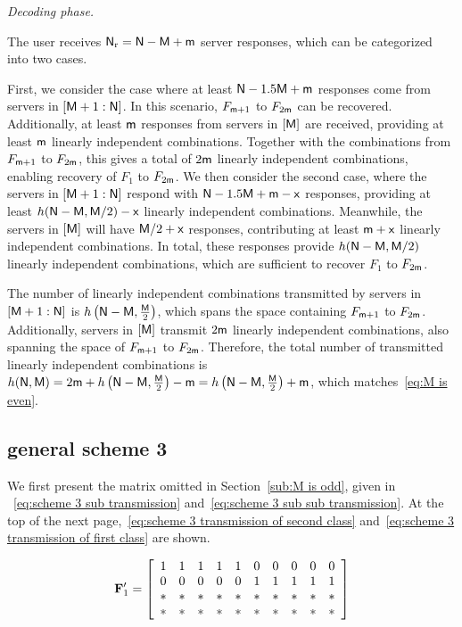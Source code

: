 \documentclass[conference,letterpaper]{IEEEtran}
\begin{document}
{\it Decoding phase.}

The user receives ${\sf N}_{\rm r} = {\sf N} - {\sf M} + {\sf m}$ server responses, which can be categorized into two cases.

First, we consider the case where at least ${\sf N} - 1.5{\sf M} + {\sf m}$ responses come from servers in $[{\sf M}+1 : {\sf N}]$. In this scenario, $F_{{\sf m}+1}$ to $F_{2{\sf m}}$ can be recovered. Additionally, at least ${\sf m}$ responses from servers in $[{\sf M}]$ are received, providing at least ${\sf m}$ linearly independent combinations. Together with the combinations from $F_{{\sf m}+1}$ to $F_{2{\sf m}}$, this gives a total of $2{\sf m}$ linearly independent combinations, enabling recovery of $F_1$ to $F_{2{\sf m}}$.
We then consider the second case, where the servers in $[{\sf M}+1: {\sf N}]$ respond with ${\sf N} - 1.5{\sf M} + {\sf m} - {\sf x}$ responses, providing at least $h({\sf N} - {\sf M}, {\sf M}/2) - {\sf x}$ linearly independent combinations. Meanwhile, the servers in $[{\sf M}]$ will have ${\sf M}/2 + {\sf x}$ responses, contributing at least ${\sf m} +{\sf x}$ linearly independent combinations. In total, these responses provide $h({\sf N} - {\sf M}, {\sf M}/2)$ linearly independent combinations, which are sufficient to recover $F_1$ to $F_{2{\sf m}}$.

The number of linearly independent combinations transmitted by servers in $[{\sf M}+1:{\sf N}]$ is $h\left({\sf N}-{\sf M}, \frac{{\sf M}}{2}\right)$, which spans the space containing $F_{{\sf m}+1}$ to $F_{2{\sf m}}$. Additionally, servers in $[{\sf M}]$ transmit $2{\sf m}$ linearly independent combinations, also spanning the space of $F_{{\sf m}+1}$ to $F_{2{\sf m}}$. Therefore, the total number of transmitted linearly independent combinations is $h({\sf N},{\sf M})= 2{\sf m} + h\left({\sf N}-{\sf M}, \frac{{\sf M}}{2}\right) - {\sf m} = h\left({\sf N}-{\sf M}, \frac{{\sf M}}{2}\right) + {\sf m}$, which matches~\eqref{eq:M is even}.

\subsection{general scheme 3}
\label{general scheme 3}

We first present the matrix omitted in Section~\ref{sub:M is odd}, given in 
~\ref{eq:scheme 3 sub transmission} and~\ref{eq:scheme 3 sub sub transmission}. 
At the top of the next page,~\ref{eq:scheme 3 transmission of second class} 
and~\ref{eq:scheme 3 transmission of first class} are shown.



\begin{equation} \label{eq:scheme 3 sub transmission}
{\bf F}^{\prime}_1= \left[
\begin{array}{cccccccccc}
  1 & 1 & 1 & 1 & 1 & 0 & 0 & 0 & 0 & 0  \\
  0 & 0 & 0 & 0 & 0 & 1 & 1 & 1 & 1 & 1 \\
  * & * & * & * & * & * & * & * & * & * \\
  * & * & * & * & * & * & * & * & * & *
\end{array}
 \right]
\end{equation}
\end{document}
